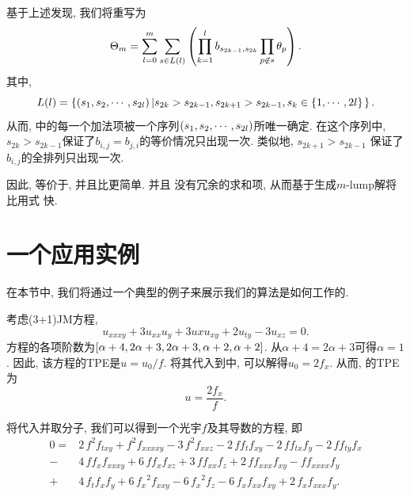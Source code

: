 基于上述发现, 我们将重写为
\begin{equation}
    \Theta_m=\sum_{l=0}^m\sum_{s\in L(l)}\left(\prod_{k=1}^l{b_{s_{2k-1},s_{2k}}}\prod_{p\not\in s}{\theta_p}\right). \label{f-lump-new}
\end{equation}
其中, 
\begin{equation}
    L(l)=\left\{\left(s_1, s_2, \cdots ,s_{2l}\right)\left|s_{2k}>s_{2k-1},s_{2k+1}>s_{2k-1},s_k\in \left\{1,\cdots,2l\right\}\right.\right\}.
\end{equation}
从而, 中的每一个加法项被一个序列$\left(s_1, s_2, \cdots ,s_{2l}\right)$所唯一确定. 在这个序列中, $s_{2k}>s_{2k-1}$保证了$b_{i,j}=b_{j,i}$的等价情况只出现一次. 类似地, $s_{2k+1}>s_{2k-1}$ 保证了$b_{i,j}$的全排列只出现一次. 

因此, 等价于, 并且比更简单. 并且 没有冗余的求和项, 从而基于生成$m$-lump解将比用式 快.


\section{一个应用实例}
在本节中, 我们将通过一个典型的例子来展示我们的算法是如何工作的.

考虑(3+1)JM方程\CITEcaJM,
\begin{equation}
    u_{xxxy}+3u_{xx}u_y+3u{x}u_{xy}+2u_{ty}-3u_{xz}=0. \label{JMEQ3}
\end{equation}
方程的各项阶数为$\left[\alpha+4,2\alpha+3,2\alpha+3,\alpha+2,\alpha+2\right]$. 从$\alpha+4=2\alpha+3$可得$\alpha=1$. 因此, 该方程的TPE是$u=u_0/f$. 将其代入到中, 可以解得$u_0=2f_x$. 从而, 的TPE为 
\begin{equation}
u=\frac{2f_x}{f}. \label{JMEQ-tr}    
\end{equation}

将代入并取分子, 我们可以得到一个光宇$f$及其导数的方程, 即 
\begin{equation}
\begin{split}
0=&2\,{f}^{2}f_{{{ txy}}}+{f}^{2}f_{{{ xxxxy}}}-3\,{f}^{2}f_{{{ xxz}}}-2\,ff_{{t}}f_{{{ xy}}}-2\,ff_{{{ tx}}}f_{{y}}-2\,ff_{{{ ty}}}f_{{x}}\\
-&4\,ff_{{x}}f_{{{ xxxy}}}+6\,ff_{{x}}f_{{{ xz}}}+3\,ff_{{{ xx}}}f_{{z}}+2\,ff_{{{ xxx}}}f_{{{xy}}}-ff_{{{ xxxx}}}f_{{y}}\\
+&4\,f_{{t}}f_{{x}}f_{{y}}+6\,{f_{{x}}}^{2}f_{{{ xxy}}}-6\,{f_{{x}}}^{2}f_{{z}}-6\,f_{{x}}f_{{{ xx}}}f_{{{ xy}}}+2\,f_{{x}}f_{{{ xxx}}}f_{{y}}. \label{JMEQ-feq}
\end{split}
\end{equation}

